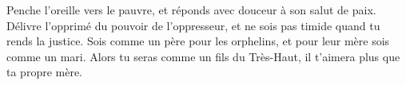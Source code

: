 Penche l’oreille vers le pauvre,
	et réponds avec douceur à son salut de paix.
Délivre l’opprimé du pouvoir de l’oppresseur,
	et ne sois pas timide quand tu rends la justice.
Sois comme un père pour les orphelins, et pour leur mère sois comme un mari.
	Alors tu seras comme un fils du Très-Haut, il t’aimera plus que ta propre mère.